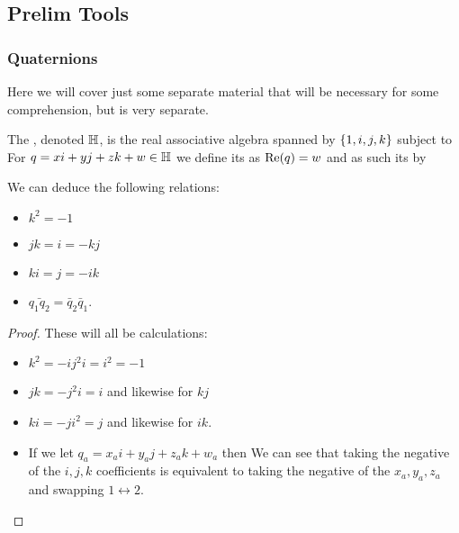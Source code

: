 \documentclass{article}
\begin{document}
\subsection{Prelim Tools}
\subsubsection{Quaternions}
Here we will cover just some separate material that will be necessary for some comprehension, but is very separate. 

\begin{definition}
	The , denoted $\mathbb{H}$, is the real associative algebra spanned by $\left\{ 1,i,j,k \right\}$ subject to 
For $q=xi+yj+zk+w\in \mathbb{H}$ we define its  as $\operatorname{Re}(q) = w$ and as such its  by 
\end{definition}

\begin{lemma}
	We can deduce the following relations:
	\begin{itemize}
		\item $k^2=-1$
		\item $jk = i = -kj$
		\item $ki = j = -ik$
		\item $\bar{q_1 q_2} = \bar{q}_2 \bar{q}_1$. 
	\end{itemize}
\end{lemma}
\begin{proof}
	These will all be calculations:
	\begin{itemize}
		\item $k^2 = -ij^2i = i^2=-1$
		\item $jk = -j^2i = i$ and likewise for $kj$
		\item $ki = -ji^2 = j$ and likewise for $ik$.
		\item If we let $q_a = x_a i + y_a j + z_a k + w_a$ then 
We can see that taking the negative of the $i,j,k$ coefficients is equivalent to taking the negative of the $x_a,y_a,z_a$ and swapping $1 \leftrightarrow 2$. 
	\end{itemize}
\end{proof}
\end{document}
